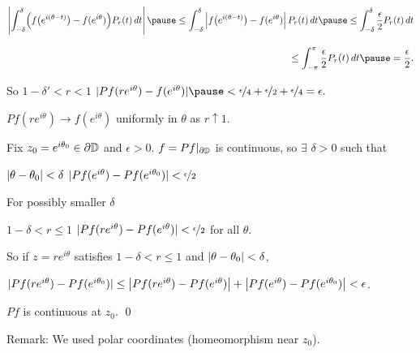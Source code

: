 \documentclass[10pt,aspectratio=169]{beamer}
\begin{document}
\begin{frame}
$\displaystyle
\abs{
\int_{-\delta}^{\delta} \Bigl( f\bigl(e^{i(\theta-t)}\bigr)-f(e^{i\theta}) \Bigr) P_r(t) \, dt
}
\pause
\leq
\int_{-\delta}^{\delta} \abs{f\bigl(e^{i(\theta-t)}\bigr)-f(e^{i\theta})}
P_r(t) \, dt
\pause
\leq
\int_{-\delta}^{\delta} \frac{\epsilon}{2} P_r(t) \, dt$

\smallskip
$\displaystyle
\hspace*{4.0in}
\leq
\int_{-\pi}^{\pi} \frac{\epsilon}{2} P_r(t) \, dt
\pause
=\frac{\epsilon}{2} .
$

\vspace*{-6pt}

\pause
So $1-\delta' < r < 1$ \wthus
$
\sabs{
Pf(r e^{i\theta} ) - f(e^{i\theta})
} \pause
< \nicefrac{\epsilon}{4} + \nicefrac{\epsilon}{2} + \nicefrac{\epsilon}{4} =
\epsilon.$

\pause
\thus \quad $Pf(re^{i\theta}) \to f(e^{i\theta})$ uniformly in $\theta$
as $r \uparrow 1$.

\pause
\medskip

Fix $z_0 = e^{i\theta_0} \in \partial {\mathbb{D}}$ and $\epsilon > 0$.
\quad
\pause
$f = Pf|_{\partial {\mathbb{D}}}$ is
continuous, so $\exists$ $\delta > 0$ such that

\medskip

$\lvert {\theta-\theta_0} \rvert < \delta$ \wthus
$
\lvert {Pf(e^{i\theta})-Pf(e^{i\theta_0})} \rvert < \nicefrac{\epsilon}{2}$

\medskip
\pause

For possibly smaller
$\delta$

\medskip

$1 - \delta < r \leq 1$ \wthus 
$\lvert {Pf(re^{i \theta})-Pf(e^{i\theta})} \rvert < \nicefrac{\epsilon}{2}$
\quad for all $\theta$.

\medskip
\pause
So if $z=re^{i\theta}$ satisfies $1 - \delta < r \leq 1$ and
$\lvert {\theta-\theta_0} \rvert < \delta$,

\medskip
\pause

$
\lvert {Pf(re^{i\theta})-Pf(e^{i\theta_0})} \rvert
\leq
\bigl\lvert {Pf(re^{i\theta})-Pf(e^{i\theta})} \bigr\rvert
+
\bigl\lvert {Pf(e^{i\theta})-Pf(e^{i\theta_0})} \bigr\rvert
 < \epsilon$.

\vspace{-1.15in}
\hspace*{4in}


\medskip
\pause

\thus \quad
$Pf$ is continuous at $z_0$.
\qed

\medskip
\pause

Remark: We used polar coordinates (homeomorphism near $z_0$).
\end{frame}
\end{document}
